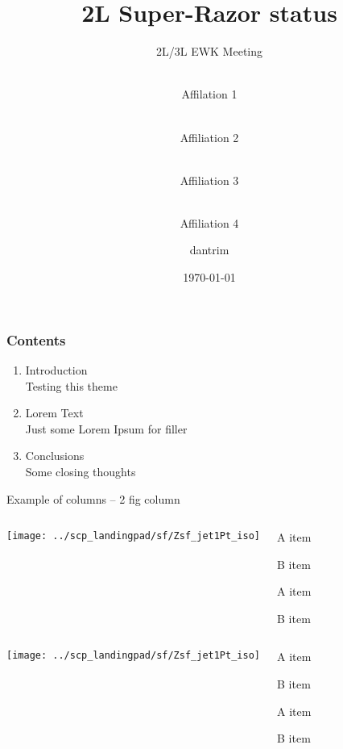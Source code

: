 \documentclass{beamer}
\author{%
  \makebox[.5\linewidth]{Author 1}\\Affilation 1\\
  \and \makebox[.5\linewidth]{Author 2}\\Affiliation 2\\
  \and \makebox[.5\linewidth]{Author 3}\\Affiliation 3\\
  \and \makebox[.5\linewidth]{Author 4}\\Affiliation 4\\
}
\title{2L Super-Razor status}
\subtitle{2L/3L EWK Meeting}
\author{dantrim}
\institute{University of California, Irvine}
\date{\today}
\begin{document}
\setcounter{showProgressBar}{0}
	\setcounter{showSlideNumbers}{1}
		\frame{\titlepage}
		
		\begin{frame}
		\frametitle{Contents}
		\begin{enumerate}
			\item Introduction \\ \textcolor{ExecusharesGrey}{\footnotesize\hspace{1em} Testing this theme}
			\item Lorem Text  \\ \textcolor{ExecusharesGrey}{\footnotesize\hspace{1em} Just some Lorem Ipsum for filler}
			\item Conclusions \\ \textcolor{ExecusharesGrey}{\footnotesize\hspace{1em} Some closing thoughts}
		\end{enumerate}
	\end{frame}

		
		
\begin{frame}{Example of columns -- 2 fig column}

	\begin{block}{}
		\begin{columns}[c]
			\column{0.5\paperwidth}
				\centering
				\texttt{[image: ../scp\_landingpad/sf/Zsf\_jet1Pt\_iso]}
			\column{0.5\paperwidth}
				\begin{itemize}
					{\footnotesize
						\item A item
						\item B item
						\item A item
						\item B item
					}
				\end{itemize}	
		\end{columns}
	\end{block}			
	\begin{block}{}
		\begin{columns}[c]
			\column{0.5\paperwidth}
				\centering
				\texttt{[image: ../scp\_landingpad/sf/Zsf\_jet1Pt\_iso]}
			\column{0.5\paperwidth}
				\begin{itemize}
					{\footnotesize
						\item A item
						\item B item
						\item A item
						\item B item
					}
				\end{itemize}	
		\end{columns}
	\end{block}
	
\end{frame}
	
\end{document}
